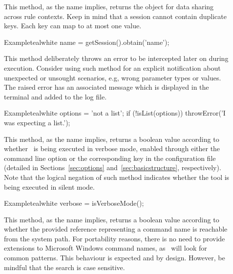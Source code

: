 \begin{description}
\item[] This method, as the name implies, returns the  object for data sharing across rule contexts. Keep in mind that a session cannot contain duplicate keys. Each key can map to at most one value.

\begin{codebox}{Example}{teal}{\icnote}{white}
name = getSession().obtain('name');
\end{codebox}

\item[] This method deliberately throws an error to be intercepted later on during execution. Consider using such method for an explicit notification about unexpected or unsought scenarios, e.g, wrong parameter types or values. The raised error has an associated message which is displayed in the terminal and added to the log file.

\begin{codebox}{Example}{teal}{\icnote}{white}
options = 'not a list';
if (!isList(options)) {
    throwError('I was expecting a list.');
}
\end{codebox}

\item[] This method, as the name implies, returns a boolean value according to whether \arara\ is being executed in verbose mode, enabled through either the  command line option or the corresponding key in the configuration file (detailed in Sections~\ref{sec:options} and~\ref{sec:basicstructure}, respectively). Note that the logical negation of such method indicates whether the tool is being executed in silent mode.

\begin{codebox}{Example}{teal}{\icnote}{white}
verbose = isVerboseMode();
\end{codebox}

\item[] This method, as the name implies, returns a boolean value according to whether the provided  reference representing a command name is reachable from the system path.  For portability reasons, there is no need to provide extensions to Microsoft Windows command names, as \arara\ will look for common patterns. This behaviour is expected and by design. However, be mindful that the search is case sensitive.


\end{description}
